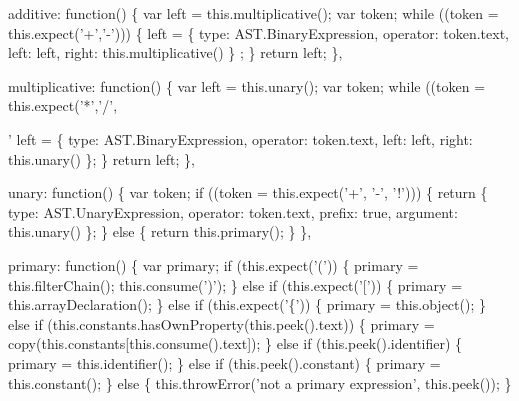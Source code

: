 \begin{DoxyCodeInclude}
{{  additive: \textcolor{keyword}{function}() \{
    var left = this.multiplicative();
    var token;
    \textcolor{keywordflow}{while} ((token = this.expect(\textcolor{charliteral}{'+'},\textcolor{charliteral}{'-'}))) \{
      left = \{ type: AST.BinaryExpression, \textcolor{keyword}{operator}: token.text, left: left, right: this.multiplicative() \}
      ;
    \}
    \textcolor{keywordflow}{return} left;
  \},

  multiplicative: \textcolor{keyword}{function}() \{
    var left = this.unary();
    var token;
    \textcolor{keywordflow}{while} ((token = this.expect(\textcolor{charliteral}{'*'},\textcolor{charliteral}{'/'},\textcolor{charliteral}{'%
      left = \{ type: AST.BinaryExpression, \textcolor{keyword}{operator}: token.text, left: left, right: this.unary() \};
    \}
    \textcolor{keywordflow}{return} left;
  \},

  unary: \textcolor{keyword}{function}() \{
    var token;
    \textcolor{keywordflow}{if} ((token = this.expect(\textcolor{charliteral}{'+'}, \textcolor{charliteral}{'-'}, \textcolor{charliteral}{'!'}))) \{
      \textcolor{keywordflow}{return} \{ type: AST.UnaryExpression, \textcolor{keyword}{operator}: token.text, prefix: \textcolor{keyword}{true}, argument: this.unary() \};
    \} \textcolor{keywordflow}{else} \{
      \textcolor{keywordflow}{return} this.primary();
    \}
  \},

  primary: \textcolor{keyword}{function}() \{
    var primary;
    \textcolor{keywordflow}{if} (this.expect(\textcolor{charliteral}{'('})) \{
      primary = this.filterChain();
      this.consume(\textcolor{charliteral}{')'});
    \} \textcolor{keywordflow}{else} \textcolor{keywordflow}{if} (this.expect(\textcolor{charliteral}{'['})) \{
      primary = this.arrayDeclaration();
    \} \textcolor{keywordflow}{else} \textcolor{keywordflow}{if} (this.expect(\textcolor{charliteral}{'\{'})) \{
      primary = this.object();
    \} \textcolor{keywordflow}{else} \textcolor{keywordflow}{if} (this.constants.hasOwnProperty(\textcolor{keyword}{this}.peek().text)) \{
      primary = copy(this.constants[this.consume().text]);
    \} \textcolor{keywordflow}{else} \textcolor{keywordflow}{if} (this.peek().identifier) \{
      primary = this.identifier();
    \} \textcolor{keywordflow}{else} \textcolor{keywordflow}{if} (this.peek().constant) \{
      primary = this.constant();
    \} \textcolor{keywordflow}{else} \{
      this.throwError(\textcolor{stringliteral}{'not a primary expression'}, this.peek());
    \}

}}}
\end{DoxyCodeInclude}
